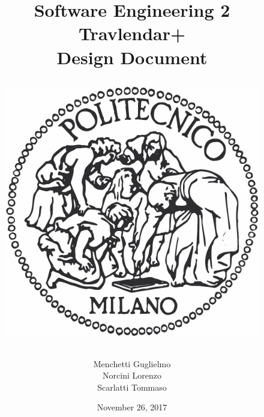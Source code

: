 \documentclass[12pt, a4paper]{article}
\begin{document}
\title{Software Engineering 2\\ \vspace{1em}  {\textbf{Travlendar+}} \\ \vspace{1em} \textbf{D}esign \textbf{D}ocument
	\vspace{1.5em}
\begin{figure}[H]
	\centering
	\includegraphics[scale=0.4]{logo}
\end{figure}
}
\author{Menchetti Guglielmo\\ Norcini Lorenzo \\ Scarlatti Tommaso}

\date{November 26, 2017}

\maketitle

\newpage
\tableofcontents

\newpage

\newpage

\newpage

\newpage

\newpage

\newpage

\newpage

%
\end{document}
